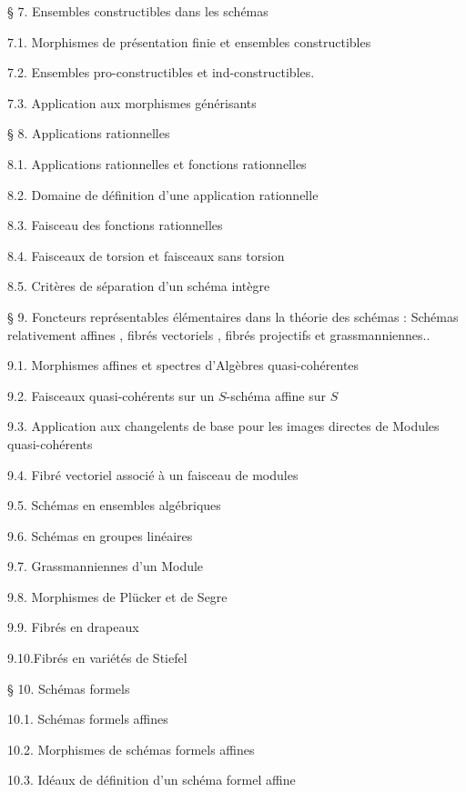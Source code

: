 
\noindent § 7. Ensembles constructibles dans les schémas\dotfill

7.1. Morphismes de présentation finie et ensembles constructibles\dotfill

7.2. Ensembles pro-constructibles et ind-constructibles.

7.3. Application aux morphismes générisants\dotfill

\noindent § 8. Applications rationnelles \dotfill

8.1. Applications rationnelles et fonctions rationnelles

8.2. Domaine de définition d'une application rationnelle

8.3. Faisceau des fonctions rationnelles\dotfill

8.4. Faisceaux de torsion et faisceaux sans torsion\dotfill

8.5. Critères de séparation d'un schéma intègre\dotfill

\noindent § 9. Foncteurs représentables élémentaires dans la théorie des schémas : Schémas relativement affines , fibrés vectoriels , fibrés projectifs et grassmanniennes..

9.1. Morphismes affines et spectres d'Algèbres quasi-cohérentes\dotfill

9.2. Faisceaux quasi-cohérents sur un $S$-schéma affine sur $S$\dotfill

9.3. Application aux changelents de base pour les images directes de Modules quasi-cohérents\dotfill

9.4. Fibré vectoriel associé à un faisceau de modules\dotfill

9.5. Schémas en ensembles algébriques\dotfill

9.6. Schémas en groupes linéaires\dotfill

9.7. Grassmanniennes d'un Module\dotfill

9.8. Morphismes de Plücker et de Segre\dotfill

9.9. Fibrés en drapeaux\dotfill

9.10.Fibrés en variétés de Stiefel\dotfill

\noindent § 10. Schémas formels\dotfill

10.1. Schémas formels affines\dotfill

10.2. Morphismes de schémas formels affines\dotfill

10.3. Idéaux de définition d'un schéma formel affine\dotfill

